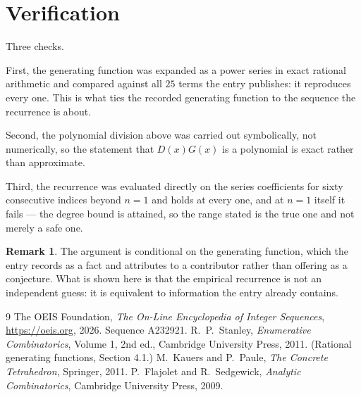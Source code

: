 \documentclass[11pt,a4paper]{article}
\theoremstyle{plain}
\theoremstyle{definition}
\newtheorem{remark}[theorem]{Remark}
\begin{document}
\section{Verification}

Three checks.

First, the generating function was expanded as a power series in exact rational arithmetic and
compared against all $25$ terms the entry publishes: it reproduces every one. This is
what ties the recorded generating function to the sequence the recurrence is about.

Second, the polynomial division above was carried out symbolically, not numerically, so the
statement that $D(x)G(x)$ is a polynomial is exact rather than approximate.

Third, the recurrence was evaluated directly on the series coefficients for sixty consecutive
indices beyond $n=1$ and holds at every one, and at $n=1$ itself it fails --- the
degree bound is attained, so the range stated is the true one and not merely a safe one.

\begin{remark}
The argument is conditional on the generating function, which the entry records as a fact and
attributes to a contributor rather than offering as a conjecture. What is shown here is that
the empirical recurrence is not an independent guess: it is equivalent to information the
entry already contains.
\end{remark}

\begin{thebibliography}{9}
 The OEIS Foundation, \emph{The On-Line Encyclopedia of Integer
Sequences}, \url{https://oeis.org}, 2026. Sequence A232921.
 R.~P.~Stanley, \emph{Enumerative Combinatorics}, Volume 1, 2nd ed.,
Cambridge University Press, 2011. (Rational generating functions, Section 4.1.)
 M.~Kauers and P.~Paule, \emph{The Concrete Tetrahedron}, Springer, 2011.
 P.~Flajolet and R.~Sedgewick, \emph{Analytic Combinatorics}, Cambridge
University Press, 2009.
\end{thebibliography}
\end{document}
